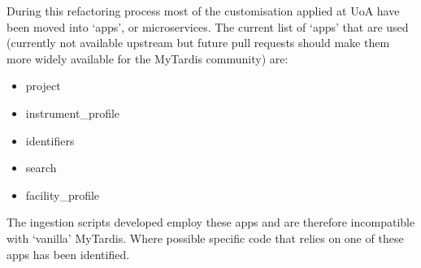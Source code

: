 \documentclass[letterpaper,10pt,english]{sphinxmanual}
\begin{document}
\sphinxAtStartPar
During this refactoring process most of the customisation applied at UoA have been moved into ‘apps’, or micro\sphinxhyphen{}services. The current list of ‘apps’ that are used (currently not available upstream but future pull requests should make them more widely available for the MyTardis community) are:
\begin{itemize}
\item {}
\sphinxAtStartPar
project

\item {}
\sphinxAtStartPar
instrument\_profile

\item {}
\sphinxAtStartPar
identifiers

\item {}
\sphinxAtStartPar
search

\item {}
\sphinxAtStartPar
facility\_profile

\end{itemize}

\sphinxAtStartPar
The ingestion scripts developed employ these apps and are therefore incompatible with ‘vanilla’ MyTardis. Where possible specific code that relies on one of these apps has been identified.
\end{document}
